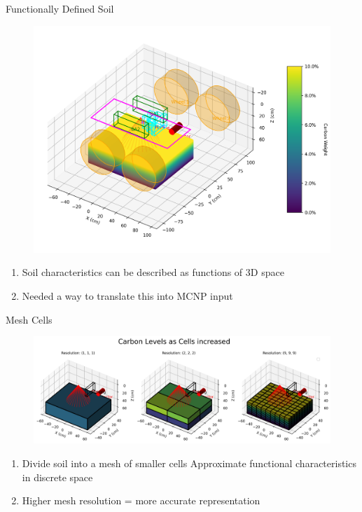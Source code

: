 \documentclass[10pt,hyperref={colorlinks,citecolor=blue,urlcolor=peking_blue,linkcolor=}]{beamer}
\theoremstyle{plain}
\begin{document}
\begin{frame}{Functionally Defined Soil}
\begin{figure}[Carbon as a function in the soil]
\begin{center}
\includegraphics[width=1\linewidth]{../Figures/FunctionallyDefinedSoil/Carbonasafunctioninthesoil.png}
\end{center}
\end{figure}
\begin{enumerate}
\item Soil characteristics can be described as functions of 3D space
\item Needed a way to translate this into MCNP input
\end{enumerate}
\end{frame}
\begin{frame}{Mesh Cells}
\begin{figure}[Single to many cells]
\begin{center}
\includegraphics[width=1\linewidth]{../Figures/MCNP/SingleToManyCells.png}
\end{center}
\end{figure}
\begin{enumerate}
\item Divide soil into a mesh of smaller cells
Approximate functional characteristics in discrete space
\item Higher mesh resolution = more accurate representation
\end{enumerate}
\end{frame}
\end{document}
